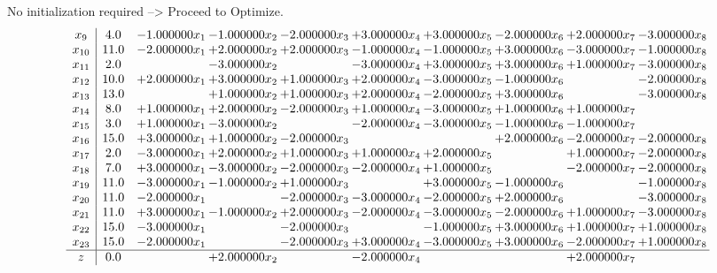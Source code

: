 \documentclass[10pt]{article}
\begin{document}
No initialization required --> Proceed to Optimize. 
\[\begin{array}{c| c c@{\hskip 2pt} c@{\hskip 2pt} c@{\hskip 2pt} c@{\hskip 2pt} c@{\hskip 2pt} c@{\hskip 2pt} c@{\hskip 2pt} c@{\hskip 2pt} }
 x_{9}   &  4.0 & -1.000000 x_{1} & -1.000000 x_{2} & -2.000000 x_{3} & + 3.000000 x_{4} & + 3.000000 x_{5} & -2.000000 x_{6} & + 2.000000 x_{7} & -3.000000 x_{8}\\
 x_{10}   &  11.0 & -2.000000 x_{1} & + 2.000000 x_{2} & + 2.000000 x_{3} & -1.000000 x_{4} & -1.000000 x_{5} & + 3.000000 x_{6} & -3.000000 x_{7} & -1.000000 x_{8}\\
 x_{11}   &  2.0  &   & -3.000000 x_{2} &   & -3.000000 x_{4} & + 3.000000 x_{5} & + 3.000000 x_{6} & + 1.000000 x_{7} & -3.000000 x_{8}\\
 x_{12}   &  10.0 & + 2.000000 x_{1} & + 3.000000 x_{2} & + 1.000000 x_{3} & + 2.000000 x_{4} & -3.000000 x_{5} & -1.000000 x_{6} &   & -2.000000 x_{8}\\
 x_{13}   &  13.0  &   & + 1.000000 x_{2} & + 1.000000 x_{3} & + 2.000000 x_{4} & -2.000000 x_{5} & + 3.000000 x_{6} &   & -3.000000 x_{8}\\
 x_{14}   &  8.0 & + 1.000000 x_{1} & + 2.000000 x_{2} & -2.000000 x_{3} & + 1.000000 x_{4} & -3.000000 x_{5} & + 1.000000 x_{6} & + 1.000000 x_{7} &   \\
 x_{15}   &  3.0 & + 1.000000 x_{1} & -3.000000 x_{2} &   & -2.000000 x_{4} & -3.000000 x_{5} & -1.000000 x_{6} & -1.000000 x_{7} &   \\
 x_{16}   &  15.0 & + 3.000000 x_{1} & + 1.000000 x_{2} & -2.000000 x_{3} &    &   & + 2.000000 x_{6} & -2.000000 x_{7} & -2.000000 x_{8}\\
 x_{17}   &  2.0 & -3.000000 x_{1} & + 2.000000 x_{2} & + 1.000000 x_{3} & + 1.000000 x_{4} & + 2.000000 x_{5} &   & + 1.000000 x_{7} & -2.000000 x_{8}\\
 x_{18}   &  7.0 & + 3.000000 x_{1} & -3.000000 x_{2} & -2.000000 x_{3} & -2.000000 x_{4} & + 1.000000 x_{5} &   & -2.000000 x_{7} & -2.000000 x_{8}\\
 x_{19}   &  11.0 & -3.000000 x_{1} & -1.000000 x_{2} & + 1.000000 x_{3} &   & + 3.000000 x_{5} & -1.000000 x_{6} &   & -1.000000 x_{8}\\
 x_{20}   &  11.0 & -2.000000 x_{1} &   & -2.000000 x_{3} & -3.000000 x_{4} & -2.000000 x_{5} & + 2.000000 x_{6} &   & -3.000000 x_{8}\\
 x_{21}   &  11.0 & + 3.000000 x_{1} & -1.000000 x_{2} & + 2.000000 x_{3} & -2.000000 x_{4} & -3.000000 x_{5} & -2.000000 x_{6} & + 1.000000 x_{7} & -3.000000 x_{8}\\
 x_{22}   &  15.0 & -3.000000 x_{1} &   & -2.000000 x_{3} &   & -1.000000 x_{5} & + 3.000000 x_{6} & + 1.000000 x_{7} & + 1.000000 x_{8}\\
 x_{23}   &  15.0 & -2.000000 x_{1} &   & -2.000000 x_{3} & + 3.000000 x_{4} & -3.000000 x_{5} & + 3.000000 x_{6} & -2.000000 x_{7} & + 1.000000 x_{8}\\
\hline
z    &  0.0  &   & + 2.000000 x_{2} &   & -2.000000 x_{4} &    &   & + 2.000000 x_{7} &   \\
\end{array}\]
\end{document}
